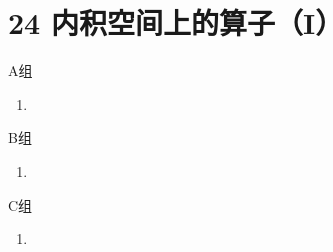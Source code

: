 \section*{24 内积空间上的算子（I）}

\vspace{2ex}

\centerline{\heiti A组}
\begin{enumerate}
    \item
\end{enumerate}

\centerline{\heiti B组}
\begin{enumerate}
    \item
\end{enumerate}

\centerline{\heiti C组}
\begin{enumerate}
    \item
\end{enumerate}

\clearpage
